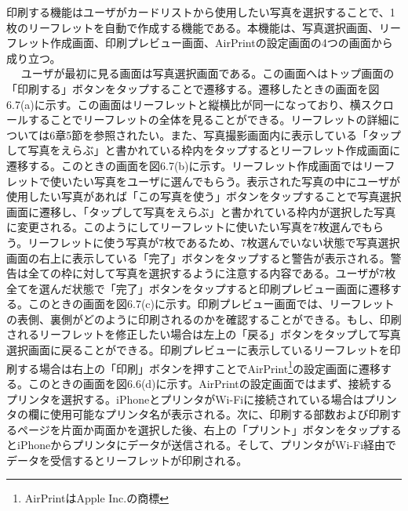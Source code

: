 印刷する機能はユーザがカードリストから使用したい写真を選択することで、1枚のリーフレットを自動で作成する機能である。本機能は、写真選択画面、リーフレット作成画面、印刷プレビュー画面、AirPrintの設定画面の4つの画面から成り立つ。\\　
ユーザが最初に見る画面は写真選択画面である。この画面へはトップ画面の「印刷する」ボタンをタップすることで遷移する。遷移したときの画面を図6.7(a)に示す。この画面はリーフレットと縦横比が同一になっており、横スクロールすることでリーフレットの全体を見ることができる。リーフレットの詳細については6章5節を参照されたい。また、写真撮影画面内に表示している「タップして写真をえらぶ」と書かれている枠内をタップするとリーフレット作成画面に遷移する。このときの画面を図6.7(b)に示す。リーフレット作成画面ではリーフレットで使いたい写真をユーザに選んでもらう。表示された写真の中にユーザが使用したい写真があれば「この写真を使う」ボタンをタップすることで写真選択画面に遷移し、「タップして写真をえらぶ」と書かれている枠内が選択した写真に変更される。このようにしてリーフレットに使いたい写真を7枚選んでもらう。リーフレットに使う写真が7枚であるため、7枚選んでいない状態で写真選択画面の右上に表示している「完了」ボタンをタップすると警告が表示される。警告は全ての枠に対して写真を選択するように注意する内容である。ユーザが7枚全てを選んだ状態で「完了」ボタンをタップすると印刷プレビュー画面に遷移する。このときの画面を図6.7(c)に示す。印刷プレビュー画面では、リーフレットの表側、裏側がどのように印刷されるのかを確認することができる。もし、印刷されるリーフレットを修正したい場合は左上の「戻る」ボタンをタップして写真選択画面に戻ることができる。印刷プレビューに表示しているリーフレットを印刷する場合は右上の「印刷」ボタンを押すことでAirPrint\footnote{AirPrintはApple Inc.の商標}の設定画面に遷移する。このときの画面を図6.6(d)に示す。AirPrintの設定画面ではまず、接続するプリンタを選択する。iPhoneとプリンタがWi-Fiに接続されている場合はプリンタの欄に使用可能なプリンタ名が表示される。次に、印刷する部数および印刷するページを片面か両面かを選択した後、右上の「プリント」ボタンをタップするとiPhoneからプリンタにデータが送信される。そして、プリンタがWi-Fi経由でデータを受信するとリーフレットが印刷される。

\newpage

